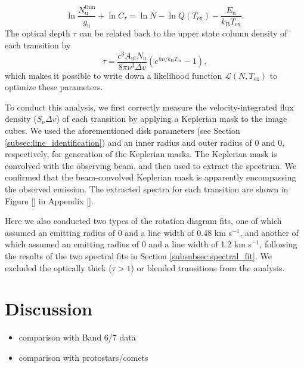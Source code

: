 \documentclass[linenumbers, twocolumn, twocolappendix, astrosymb, times]{aastex631}
\begin{document}
\begin{equation}
    \ln\frac{N_\mathrm{u}^\mathrm{thin}}{g_\mathrm{u}} + \ln C_\tau = \ln N - \ln Q(T_\mathrm{ex}) - \frac{E_\mathrm{u}}{k_\mathrm{B}T_\mathrm{ex}}.
\end{equation}
The optical depth $\tau$ can be related back to the upper state column density of each transition by 
\begin{equation}
    \tau = \frac{c^3A_\mathrm{ul}N_\mathrm{u}}{8\pi\nu^3\Delta v}\left(e^{h\nu/k_\mathrm{B}T_\mathrm{ex}} - 1\right),
\end{equation}
which makes it possible to write down a likelihood function $\mathcal{L}(N, T_\mathrm{ex})$ to optimize these parameters. 

To conduct this analysis, we first correctly measure the velocity-integrated flux density ($S_\nu\Delta v$) of each transition by applying a Keplerian mask to the image cubes. We used the aforementioned disk parameters (see Section \ref{subsec:line_identification}) and an inner radius and outer radius of 0 and 0, respectively, for generation of the Keplerian masks. The Keplerian mask is convolved with the observing beam, and then used to extract the spectrum. We confirmed that the beam-convolved Keplerian mask is apparently encompassing the observed emission. The extracted spectra for each transition are shown in Figure \ref{} in Appendix \ref{}. 



Here we also conducted two types of the rotation diagram fits, one of which assumed an emitting radius of 0 and a line width of 0.48 km s$^{-1}$, and another of which assumed an emitting radius of 0 and a line width of 1.2 km s$^{-1}$, following the results of the two spectral fits in Section \ref{subsubsec:spectral_fit}. We excluded the optically thick ($\tau > 1$) or blended transitions from the analysis. 








\section{Discussion} \label{sec:discussion}
\begin{itemize}
    \item comparison with Band 6/7 data
    \item comparison with protostars/comets
\end{itemize}
\end{document}
